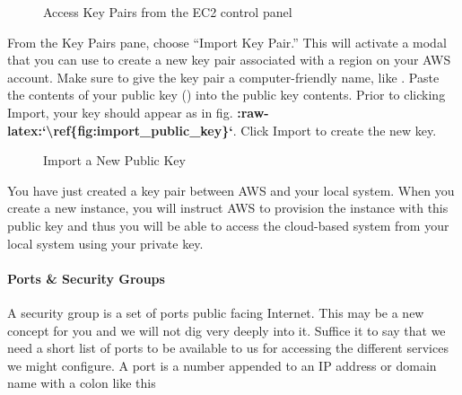\documentclass[letterpaper,10pt,english]{sphinxmanual}
\begin{document}
\begin{figure}[htbp]
\centering
\capstart

\noindent{}
\caption{Access Key Pairs from the EC2 control panel}\label{\detokenize{01-amazon-web-services:id33}}\end{figure}

From the Key Pairs pane, choose “Import Key Pair.” This will activate a
modal that you can use to create a new key pair associated with a region
on your AWS account. Make sure to give the key pair a computer-friendly
name, like . Paste the contents of your public key
() into the public key contents. Prior to clicking Import,
your key should appear as in fig.
{\color{red}\bfseries{}:raw-latex:{}`\textbackslash{}ref\{fig:import\_public\_key\}{}`}. Click Import to create the new
key.

\begin{figure}[htbp]
\centering
\capstart

\noindent{}
\caption{Import a New Public Key}\label{\detokenize{01-amazon-web-services:id34}}\end{figure}

You have just created a key pair between AWS and your local system. When
you create a new instance, you will instruct AWS to provision the
instance with this public key and thus you will be able to access the
cloud-based system from your local system using your private key.


\paragraph{Ports \& Security Groups}
\label{\detokenize{01-amazon-web-services:Ports-_-Security-Groups}}
A security group is a set of ports public facing Internet. This may be a
new concept for you and we will not dig very deeply into it. Suffice it
to say that we need a short list of ports to be available to us for
accessing the different services we might configure. A port is a number
appended to an IP address or domain name with a colon like this

%
\begin{sphinxVerbatim}[commandchars=\\\{\}]
\end{sphinxVerbatim}
\end{document}
